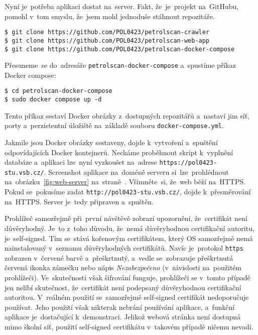 Nyní je~potřeba aplikaci dostat na~server. Fakt, že~je~projekt na~GitHubu,
pomohl v~tom smyslu, že~jsem mohl jednoduše stáhnout repozitáře.

\begin{verbatim}
$ git clone https://github.com/POL0423/petrolscan-crawler
$ git clone https://github.com/POL0423/petrolscan-web-app
$ git clone https://github.com/POL0423/petrolscan-docker-compose
\end{verbatim}

Přesuneme~se do~adresáře \texttt{petrolscan-docker-compose} a~spustíme
příkaz Docker compose:

\begin{verbatim}
$ cd petrolscan-docker-compose
$ sudo docker compose up -d
\end{verbatim}

Tento příkaz sestaví Docker obrázky z~dostupných repozitářů a~nastaví
jim síť, porty a~perzistentní úložiště na~základě souboru
\texttt{docker-compose.yml}.

Jakmile jsou Docker obrázky sestaveny, dojde k~vytvoření a~spuštění
odpovídajících Docker kontejnerů. Necháme proběhnout skript k~vyplnění
databáze a~aplikaci lze~nyní vyzkoušet na~adrese
\texttt{https://pol0423-stu.vsb.cz/}. Screenshot aplikace na~doméně
serveru si~lze~prohlédnout na~obrázku~\ref{fig:web-server}
na~straně~\pageref{fig:web-server}. Všimněte~si, že~web běží na~HTTPS.
Pokud se~pokusíme zadat \texttt{http://pol0423-stu.vsb.cz/}, dojde
k~přesměrování na~HTTPS. Server je~tedy připraven a~spuštěn.

Prohlížeč samozřejmě při~první návštěvě zobrazí upozornění, že~certifikát
není důvěryhodný. Je~to z~toho důvodu, že~nemá důvěryhodnou certifikační
autoritu, je~self-signed. Tím se~stává kořenovým certifikátem, který OS
samozřejmě nemá nainstalovaný v~seznamu důvěryhodných certifikátů.
Navíc je~protokol \texttt{https} zobrazen v~červené barvě a~přeškrtnutý,
a~vedle se~zobrazuje přeškrtnutá červená ikonka zámečku nebo nápis
\emph{Nezabezpečeno} (v~závislosti na~použitém prohlížeči). Ve~skutečnosti
však šifrování funguje, prohlížeči se v~tomto případě jen nelíbí skutečnost,
že~certifikát není podepsaný důvěryhodnou certifikační autoritou.
V~reálném použití se~samozřejmě self-signed certifikát nedoporučuje používat.
Jeho použití však nikterak nebrání používání aplikace, a~funkční aplikace
je~dostačující k~demonstraci. Jelikož webová stránka není dostupná mimo
školní síť, použití self-signed certifikátu v~takovém případě ničemu nevadí.

\endinput
